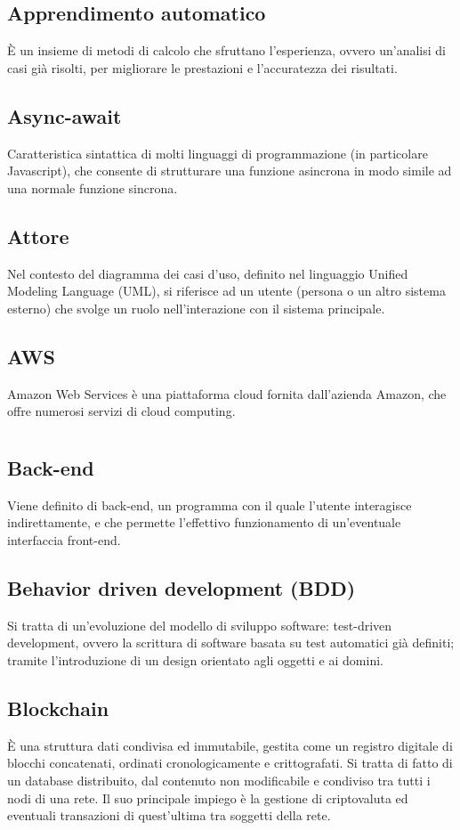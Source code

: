 	\subsection*{Apprendimento automatico}
	È un insieme di metodi di calcolo che sfruttano l’esperienza, ovvero un’analisi di casi già risolti, per migliorare le prestazioni e l’accuratezza dei risultati.
	\subsection*{Async-await}
	Caratteristica sintattica di molti linguaggi di programmazione (in particolare Javascript), che consente di strutturare una funzione asincrona in modo simile ad una normale funzione sincrona.
	\subsection*{Attore}
	Nel contesto del diagramma dei casi d’uso, definito nel linguaggio Unified Modeling Language (UML), si riferisce ad un utente (persona o un altro sistema esterno) che svolge un ruolo nell’interazione con il sistema principale.
	\subsection*{AWS}
	Amazon Web Services è una piattaforma cloud fornita dall’azienda Amazon, che offre numerosi servizi di cloud computing.
\pagebreak
\section[B]{}
	\subsection*{Back-end}
	Viene definito di back-end, un programma con il quale l’utente interagisce indirettamente, e che permette l’effettivo funzionamento di un’eventuale interfaccia front-end.
	\subsection*{Behavior driven development (BDD)}
	Si tratta di un’evoluzione del modello di sviluppo software: test-driven development, ovvero la scrittura di software basata su test automatici già definiti; tramite l’introduzione di un design orientato agli oggetti e ai domini.
	\subsection*{Blockchain}
	È una struttura dati condivisa ed immutabile, gestita come un registro digitale di blocchi concatenati, ordinati cronologicamente e crittografati. Si tratta di fatto di un database distribuito, dal contenuto non modificabile e condiviso tra tutti i nodi di una rete. Il suo principale impiego è la gestione di criptovaluta ed eventuali transazioni di quest’ultima tra soggetti della rete.

